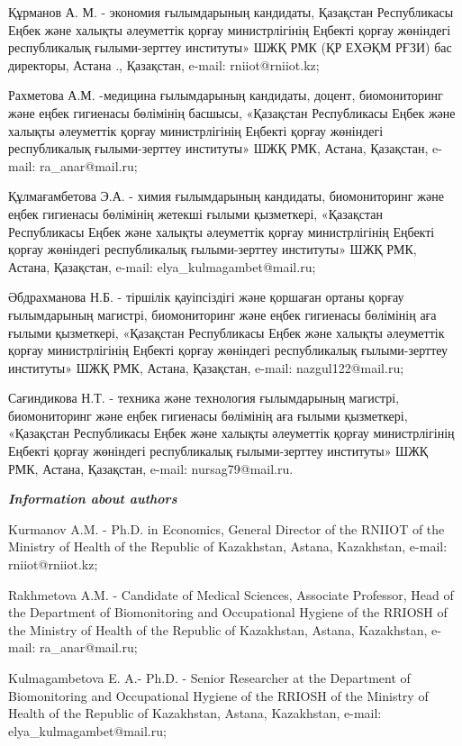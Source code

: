 Құрманов А. М. - экономия ғылымдарының кандидаты, Қазақстан Республикасы
Еңбек және халықты әлеуметтік қорғау министрлігінің Еңбекті қорғау
жөніндегі республикалық ғылыми-зерттеу институты» ШЖҚ РМК (ҚР ЕХӘҚМ
РҒЗИ) бас директоры, Астана ., Қазақстан, e-mail: rniiot@rniiot.kz;

Рахметова А.М. -медицина ғылымдарының кандидаты, доцент, биомониторинг
және еңбек гигиенасы бөлімінің басшысы, «Қазақстан Республикасы Еңбек
және халықты әлеуметтік қорғау министрлігінің Еңбекті қорғау жөніндегі
республикалық ғылыми-зерттеу институты» ШЖҚ РМК, Астана, Қазақстан,
e-mail: ra\_anar@mail.ru;

Құлмағамбетова Э.А. - химия ғылымдарының кандидаты, биомониторинг және
еңбек гигиенасы бөлімінің жетекші ғылыми қызметкері, «Қазақстан
Республикасы Еңбек және халықты әлеуметтік қорғау министрлігінің Еңбекті
қорғау жөніндегі республикалық ғылыми-зерттеу институты» ШЖҚ РМК,
Астана, Қазақстан, e-mail: elya\_kulmagambet@mail.ru;

Әбдрахманова Н.Б. - тіршілік қауіпсіздігі және қоршаған ортаны қорғау
ғылымдарының магистрі, биомониторинг және еңбек гигиенасы бөлімінің аға
ғылыми қызметкері, «Қазақстан Республикасы Еңбек және халықты әлеуметтік
қорғау министрлігінің Еңбекті қорғау жөніндегі республикалық
ғылыми-зерттеу институты» ШЖҚ РМК, Астана, Қазақстан, e-mail:
nazgul122@mail.ru;

Сағиндикова Н.Т. - техника және технология ғылымдарының магистрі,
биомониторинг және еңбек гигиенасы бөлімінің аға ғылыми қызметкері,
«Қазақстан Республикасы Еңбек және халықты әлеуметтік қорғау
министрлігінің Еңбекті қорғау жөніндегі республикалық ғылыми-зерттеу
институты» ШЖҚ РМК, Астана, Қазақстан, e-mail: nursag79@mail.ru.

\emph{{\bfseries Information about authors}}

Kurmanov A.M. - Ph.D. in Economics, General Director of the RNIIOT of
the Ministry of Health of the Republic of Kazakhstan, Astana,
Kazakhstan, e-mail: rniiot@rniiot.kz;

Rakhmetova A.M. - Candidate of Medical Sciences, Associate Professor,
Head of the Department of Biomonitoring and Occupational Hygiene of the
RRIOSH of the Ministry of Health of the Republic of Kazakhstan, Astana,
Kazakhstan, e-mail: ra\_anar@mail.ru;

Kulmagambetova E. A.- Ph.D. - Senior Researcher at the Department of
Biomonitoring and Occupational Hygiene of the RRIOSH of the Ministry of
Health of the Republic of Kazakhstan, Astana, Kazakhstan, e-mail:
elya\_kulmagambet@mail.ru;

